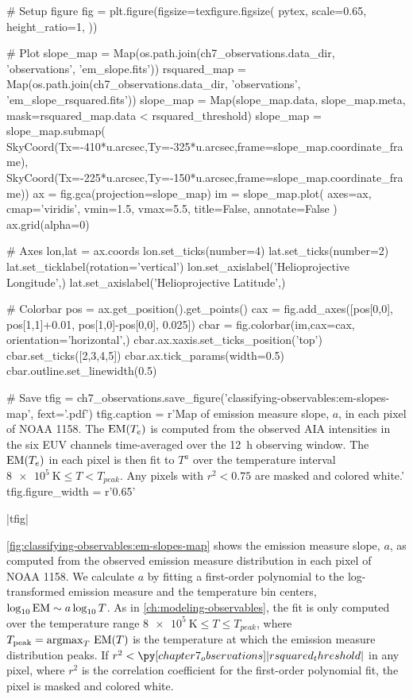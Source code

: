 \begin{pycode}
# Setup figure
fig = plt.figure(figsize=texfigure.figsize(
    pytex,
    scale=0.65,
    height_ratio=1,
))

# Plot
slope_map = Map(os.path.join(ch7_observations.data_dir, 'observations', 'em_slope.fits'))
rsquared_map = Map(os.path.join(ch7_observations.data_dir, 'observations', 'em_slope_rsquared.fits'))
slope_map = Map(slope_map.data, slope_map.meta, mask=rsquared_map.data < rsquared_threshold)
slope_map = slope_map.submap(
    SkyCoord(Tx=-410*u.arcsec,Ty=-325*u.arcsec,frame=slope_map.coordinate_frame),
    SkyCoord(Tx=-225*u.arcsec,Ty=-150*u.arcsec,frame=slope_map.coordinate_frame))
ax = fig.gca(projection=slope_map)
im = slope_map.plot(
    axes=ax,
    cmap='viridis',
    vmin=1.5,
    vmax=5.5,
    title=False,
    annotate=False
)
ax.grid(alpha=0)

# Axes
lon,lat = ax.coords
lon.set_ticks(number=4)
lat.set_ticks(number=2)
lat.set_ticklabel(rotation='vertical')
lon.set_axislabel('Helioprojective Longitude',)
lat.set_axislabel('Helioprojective Latitude',)

# Colorbar
pos = ax.get_position().get_points()
cax = fig.add_axes([pos[0,0], pos[1,1]+0.01, pos[1,0]-pos[0,0], 0.025])
cbar = fig.colorbar(im,cax=cax, orientation='horizontal',)
cbar.ax.xaxis.set_ticks_position('top')
cbar.set_ticks([2,3,4,5])
cbar.ax.tick_params(width=0.5)
cbar.outline.set_linewidth(0.5)

# Save
tfig = ch7_observations.save_figure('classifying-observables:em-slopes-map', fext='.pdf')
tfig.caption = r'Map of emission measure slope, $a$, in each pixel of \AR{} NOAA 1158. The $\textup{EM}(T_e)$ is computed from the observed AIA intensities in the six EUV channels time-averaged over the \SI{12}{\hour} observing window. The $\textup{EM}(T_e)$ in each pixel is then fit to $T^a$ over the temperature interval $\SI{8e5}{\kelvin}\le T < T_{peak}$. Any pixels with $r^2<0.75$ are masked and colored white.'
tfig.figure_width = r'0.65\textwidth'
\end{pycode}
|tfig|

\autoref{fig:classifying-observables:em-slopes-map} shows the emission measure slope, $a$, as computed from the observed emission measure distribution in each pixel of \AR{} NOAA 1158. We calculate $a$ by fitting a first-order polynomial to the log-transformed emission measure and the temperature bin centers, $\log_{10}\textup{EM}\sim a\log_{10}T$. As in \autoref{ch:modeling-observables}, the fit is only computed over the temperature range $\SI{8e5}{\kelvin}\le T \le T_{peak}$, where $T_\textup{peak}=\operatorname*{argmax}_T\,\textup{EM}(T)$ is the temperature at which the emission measure distribution peaks. If $r^2<\py[chapter7_observations]|rsquared_threshold|$ in any pixel, where $r^2$ is the correlation coefficient for the first-order polynomial fit, the pixel is masked and colored white. 

